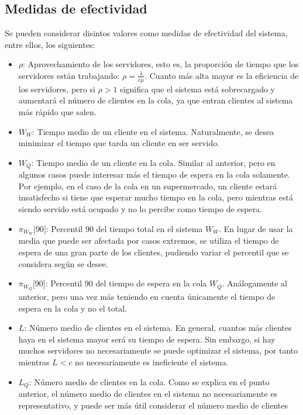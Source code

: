 \documentclass[a4paper,10pt]{scrartcl}
\theoremstyle{definition}
\numberwithin{equation}{section}
\begin{document}
	\subsection{Medidas de efectividad}
	Se pueden considerar disintos valores como medidas de efectividad del sistema, entre ellos, los siguientes:
	\begin{itemize}
		\item $\rho$:
		Aprovechamiento de los servidores, esto es, la proporción de tiempo que los servidores están trabajando: 
		$\rho = \frac{\lambda}{c\mu}$. Cuanto más alta mayor es la eficiencia de los servidores, pero 
		si $\rho > 1$ significa que el sistema está sobrecargado y aumentará el número de clientes en la cola, 
		ya que entran clientes al sistema más rápido que salen.
		\item $W_W$:
		Tiempo medio de un cliente en el sistema. Naturalmente, se desea minimizar el tiempo que tarda un 
		cliente en ser servido.
		\item $W_Q$:
		Tiempo medio de un cliente en la cola. Similar al anterior, pero en algunos casos puede interesar más 
		el tiempo de espera en la cola solamente. Por ejemplo, en el caso de la cola en un supermercado, un 
		cliente estará insatisfecho si tiene que esperar mucho tiempo en la cola, pero mientras está siendo 
		servido está ocupado y no lo percibe como tiempo de espera.
		\item $\pi_{W_W} \lbrack 90 \rbrack$:
		Percentil 90 del tiempo total en el sistema $W_W$. En lugar de usar la media que puede ser afectada por 
		casos extremos, se utiliza el tiempo de espera de una gran parte de los clientes, pudiendo variar el 
		percentil que se considera según se desee.
		\item $\pi_{W_Q} \lbrack 90 \rbrack$:
		Percentil 90 del tiempo de espera en la cola $W_Q$. Análogamente al anterior, pero una vez más teniendo en
		cuenta únicamente el tiempo de espera en la cola y no el total.
		\item $L$:
		Número medio de clientes en el sistema. En general, cuantos más clientes haya en el sistema mayor será su
		tiempo de espera. Sin embargo, si hay muchos servidores no necesariamente se puede optimizar el sistema,
		por tanto mientras $L<c$ no necesariamente es ineficiente el sistema.
		\item $L_Q$:
		Número medio de clientes en la cola. Como se explica en el punto anterior, el número medio de clientes en 
		el sistema no necesariamente es representativo, y puede ser más útil considerar el número medio de clientes

\end{itemize}
\end{document}
